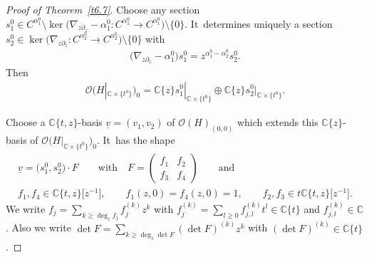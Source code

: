 \documentclass[10pt,a4paper]{amsart}
\numberwithin{equation}{section}
\numberwithin{figure}{section}
\newcommand{\C}{{\mathbb C}}
\newcommand{\OO}{{\mathcal O}}
\newcommand{\uuuu}{\underline}
\newcommand{\paa}{\partial}
\newcommand{\nnn}{\nabla}
\begin{document}
\begin{proof}[Proof of Theorem~\ref{t6.7}]
Choose any section
$s_1^0\in C^{\alpha_1^0}\setminus \ker\big(\nnn_{z\paa_z}-\alpha_1^0\colon C^{\alpha_1^0}
\to C^{\alpha_1^0}\big)\setminus\{0\}$. It~determines uniquely a section
$s_2^0\in \ker\big(\nnn_{z\paa_z}\colon C^{\alpha_2^0}\to C^{\alpha_2^0}\big)\setminus\{0\}$
with
\begin{gather*}%
\big(\nnn_{z\paa_z}-\alpha_1^0\big)s_1^0
=z^{\alpha_1^0-\alpha_2^0}s_2^0.
\end{gather*}
Then
\begin{gather*}%
\OO\big(H|_{\C\times\{t^0\}}\big)_0=\C\{z\}s_1^0|_{\C\times\{t^0\}}
\oplus \C\{z\}s_2^0|_{\C\times\{t^0\}}.
\end{gather*}

{\sloppy
Choose a $\C\{t,z\}$-basis $\uuuu{v}=(v_1,v_2)$ of
$\OO(H)_{(0,0)}$ which extends this $\C\{z\}$-basis of
$\OO\big(H|_{\C\times\{t^0\}}\big)_0$. It~has the shape
\begin{gather}
\uuuu{v}= \big(s_1^0,s_2^0\big)\cdot F\qquad \text{with}\quad
F=\begin{pmatrix} f_1 & f_2\\f_3&f_4\end{pmatrix}
\qquad\text{and}\nonumber
\\
f_1,f_4\in\C\{t,z\}\big[z^{-1}\big],\qquad
f_1(z,0)=f_4(z,0)=1,\qquad
f_2,f_3\in t\C\{t,z\}\big[z^{-1}\big].\label{6.57}
\end{gather}}\noindent
We write $f_j=\sum_{k\geq \deg_zf_j}f_j^{(k)}z^k$ with
$f_j^{(k)}=\sum_{l\geq 0}f_{j,l}^{(k)}t^l\in\C\{t\}$
and $f_{j,l}^{(k)}\in\C$.
Also we write
$\det F=\sum_{k\geq \deg_z\det F}(\det F)^{(k)}z^k$
with $(\det F)^{(k)}\in\C\{t\}$.


\end{proof}
\end{document}
